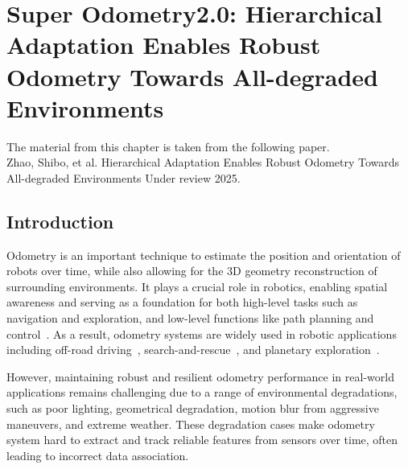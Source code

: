 \chapter[Completed: Super Odometry2.0: Hierarchical Adaptation Enables Robust Odometry Towards
All-degraded Environments]{Super Odometry2.0: Hierarchical Adaptation Enables Robust Odometry Towards
All-degraded Environments}

\label{chapter:superodom2.0}

\begin{framed} The material from this chapter is taken from the following paper. \\
Zhao, Shibo, et al. Hierarchical Adaptation Enables Robust Odometry Towards
All-degraded Environments  Under review 2025.
\end{framed}




\section{Introduction}
Odometry is an important technique to estimate the position and orientation of robots over time, while also allowing for the 3D geometry reconstruction of surrounding environments. It plays a crucial role in robotics, enabling spatial awareness and serving as a foundation for both high-level tasks such as navigation and exploration, and low-level functions like path planning and control~\cite{thrun2002probabilistic}. As a result, odometry systems are widely used in robotic applications including off-road driving~\cite{selfdriving}, search-and-rescue~\cite{Scherer:2022}, and planetary exploration~\cite{mahlknecht2022exploring}. 

However, maintaining robust and resilient odometry performance in real-world applications remains challenging due to a range of environmental degradations, such as poor lighting, geometrical degradation, motion blur from aggressive maneuvers, and extreme weather. These degradation cases make odometry system hard to extract and track reliable features from sensors over time, often leading to incorrect data association\cite{cadena2016past}.



